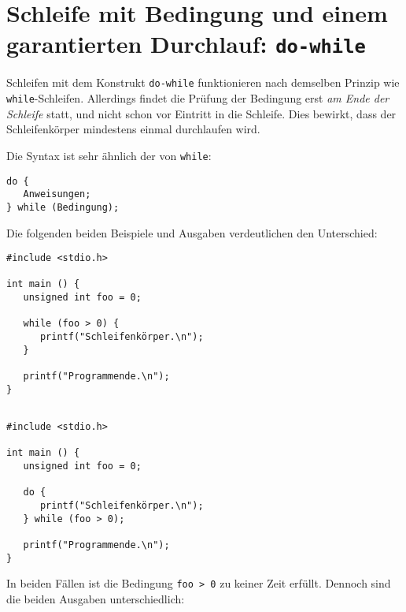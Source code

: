\section{Schleife mit Bedingung und einem garantierten Durchlauf: \texttt{do-while}}
Schleifen mit dem Konstrukt \texttt{do-while} funktionieren nach demselben Prinzip wie \texttt{while}-Schleifen. Allerdings findet die Prüfung der Bedingung erst \emph{am Ende der Schleife} statt, und nicht schon vor Eintritt in die Schleife. Dies bewirkt, dass der Schleifenkörper mindestens einmal durchlaufen wird.

Die Syntax ist sehr ähnlich der von \texttt{while}:
\begin{codebox}
\begin{verbatim}
do {
   Anweisungen;
} while (Bedingung);
\end{verbatim}
\end{codebox}

Die folgenden beiden Beispiele und Ausgaben verdeutlichen den Unterschied:
\begin{tcbraster}[raster columns=2,
                  raster equal height,
                  nobeforeafter,
                  raster column skip=0.5cm]
\begin{codebox}
\begin{verbatim}
#include <stdio.h>

int main () {
   unsigned int foo = 0;

   while (foo > 0) {
      printf("Schleifenkörper.\n");
   }

   printf("Programmende.\n");
}
\end{verbatim}
\end{codebox}
%
\begin{codebox}
\begin{verbatim}

#include <stdio.h>

int main () {
   unsigned int foo = 0;

   do {
      printf("Schleifenkörper.\n");
   } while (foo > 0);

   printf("Programmende.\n");
}
\end{verbatim}
\end{codebox}
\end{tcbraster}

In beiden Fällen ist die Bedingung \texttt{foo > 0} zu keiner Zeit erfüllt. Dennoch sind die beiden Ausgaben unterschiedlich:

